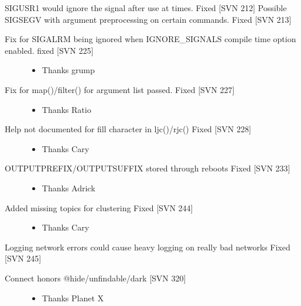 \documentclass[letterpaper,10pt,english]{sphinxmanual}
\begin{document}
\sphinxAtStartPar
SIGUSR1 would ignore the signal after use at times.  Fixed {[}SVN 212{]}
Possible SIGSEGV with argument preprocessing on certain commands.  Fixed {[}SVN 213{]}
\begin{description}
\item[{Fix for SIGALRM being ignored when IGNORE\_SIGNALS compile time option enabled. fixed {[}SVN 225{]}}] \leavevmode\begin{itemize}
\item {} 
\sphinxAtStartPar
Thanks grump

\end{itemize}

\item[{Fix for map()/filter() for argument list passed.  Fixed {[}SVN 227{]}}] \leavevmode\begin{itemize}
\item {} 
\sphinxAtStartPar
Thanks Ratio

\end{itemize}

\item[{Help not documented for fill character in ljc()/rjc() \sphinxhyphen{} Fixed {[}SVN 228{]}}] \leavevmode\begin{itemize}
\item {} 
\sphinxAtStartPar
Thanks Cary

\end{itemize}

\item[{OUTPUTPREFIX/OUTPUTSUFFIX stored through reboots \sphinxhyphen{} Fixed {[}SVN 233{]}}] \leavevmode\begin{itemize}
\item {} 
\sphinxAtStartPar
Thanks Adrick

\end{itemize}

\item[{Added missing topics for clustering \sphinxhyphen{} Fixed {[}SVN 244{]}}] \leavevmode\begin{itemize}
\item {} 
\sphinxAtStartPar
Thanks Cary

\end{itemize}

\end{description}

\sphinxAtStartPar
Logging network errors could cause heavy logging on really bad networks \sphinxhyphen{} Fixed {[}SVN 245{]}
\begin{description}
\item[{Connect honors @hide/unfindable/dark {[}SVN 320{]}}] \leavevmode\begin{itemize}
\item {} 
\sphinxAtStartPar
Thanks Planet X

\end{itemize}

\end{description}
\end{document}
